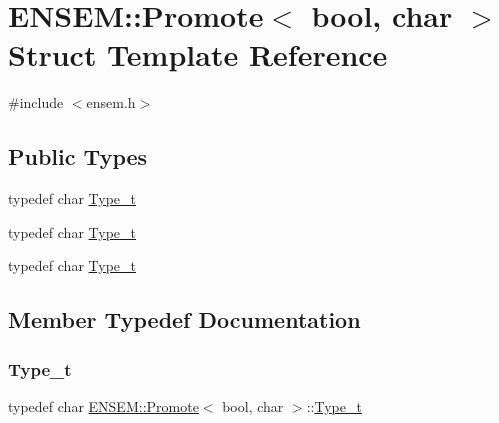 \hypertarget{structENSEM_1_1Promote_3_01bool_00_01char_01_4}{}\section{E\+N\+S\+EM\+:\+:Promote$<$ bool, char $>$ Struct Template Reference}
\label{structENSEM_1_1Promote_3_01bool_00_01char_01_4}


{\ttfamily \#include $<$ensem.\+h$>$}

\subsection*{Public Types}
\begin{DoxyCompactItemize}
\item 
typedef char \mbox{\hyperlink{structENSEM_1_1Promote_3_01bool_00_01char_01_4_a77d88dbc5eb685f290b3b9bb1b2b2a67}{Type\+\_\+t}}
\item 
typedef char \mbox{\hyperlink{structENSEM_1_1Promote_3_01bool_00_01char_01_4_a77d88dbc5eb685f290b3b9bb1b2b2a67}{Type\+\_\+t}}
\item 
typedef char \mbox{\hyperlink{structENSEM_1_1Promote_3_01bool_00_01char_01_4_a77d88dbc5eb685f290b3b9bb1b2b2a67}{Type\+\_\+t}}
\end{DoxyCompactItemize}


\subsection{Member Typedef Documentation}
\mbox{\label{structENSEM_1_1Promote_3_01bool_00_01char_01_4_a77d88dbc5eb685f290b3b9bb1b2b2a67}} 
\subsubsection{\texorpdfstring{Type\_t}{Type\_t}\hspace{0.1cm}{\footnotesize\ttfamily [1/3]}}
{\footnotesize\ttfamily typedef char \mbox{\hyperlink{structENSEM_1_1Promote}{E\+N\+S\+E\+M\+::\+Promote}}$<$ bool, char $>$\+::\mbox{\hyperlink{structENSEM_1_1Promote_3_01bool_00_01char_01_4_a77d88dbc5eb685f290b3b9bb1b2b2a67}{Type\+\_\+t}}}

\mbox{\label{structENSEM_1_1Promote_3_01bool_00_01char_01_4_a77d88dbc5eb685f290b3b9bb1b2b2a67}} 
